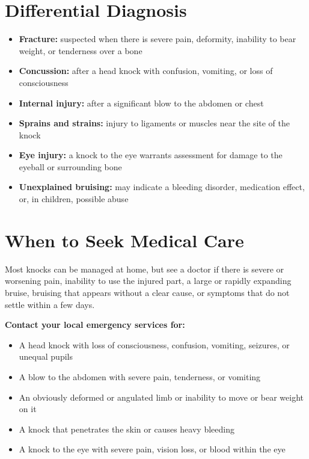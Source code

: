\section*{Differential Diagnosis}
\begin{itemize}
    \item \textbf{Fracture:} suspected when there is severe pain, deformity, inability to bear weight, or tenderness over a bone
    \item \textbf{Concussion:} after a head knock with confusion, vomiting, or loss of consciousness
    \item \textbf{Internal injury:} after a significant blow to the abdomen or chest
    \item \textbf{Sprains and strains:} injury to ligaments or muscles near the site of the knock
    \item \textbf{Eye injury:} a knock to the eye warrants assessment for damage to the eyeball or surrounding bone
    \item \textbf{Unexplained bruising:} may indicate a bleeding disorder, medication effect, or, in children, possible abuse
\end{itemize}

\section*{When to Seek Medical Care}
Most knocks can be managed at home, but see a doctor if there is severe or worsening pain, inability to use the injured part, a large or rapidly expanding bruise, bruising that appears without a clear cause, or symptoms that do not settle within a few days.

\textbf{Contact your local emergency services for:}
\begin{itemize}
    \item A head knock with loss of consciousness, confusion, vomiting, seizures, or unequal pupils
    \item A blow to the abdomen with severe pain, tenderness, or vomiting
    \item An obviously deformed or angulated limb or inability to move or bear weight on it
    \item A knock that penetrates the skin or causes heavy bleeding
    \item A knock to the eye with severe pain, vision loss, or blood within the eye
\end{itemize}

